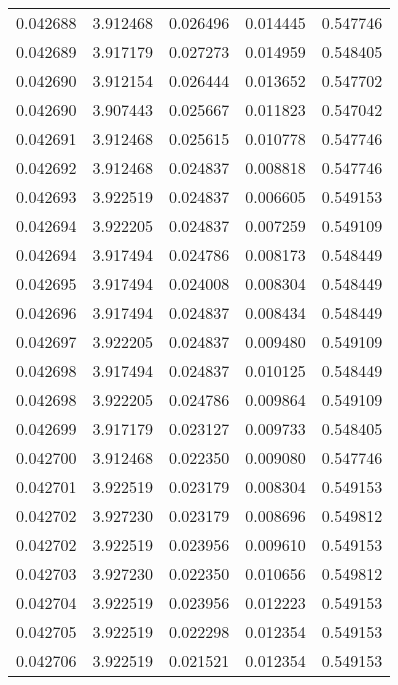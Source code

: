 \begin{tabular}{lrrrr}
0.042688    &  3.912468 &  0.026496 &  0.014445 &             0.547746 \\
0.042689    &  3.917179 &  0.027273 &  0.014959 &             0.548405 \\
0.042690    &  3.912154 &  0.026444 &  0.013652 &             0.547702 \\
0.042690    &  3.907443 &  0.025667 &  0.011823 &             0.547042 \\
0.042691    &  3.912468 &  0.025615 &  0.010778 &             0.547746 \\
0.042692    &  3.912468 &  0.024837 &  0.008818 &             0.547746 \\
0.042693    &  3.922519 &  0.024837 &  0.006605 &             0.549153 \\
0.042694    &  3.922205 &  0.024837 &  0.007259 &             0.549109 \\
0.042694    &  3.917494 &  0.024786 &  0.008173 &             0.548449 \\
0.042695    &  3.917494 &  0.024008 &  0.008304 &             0.548449 \\
0.042696    &  3.917494 &  0.024837 &  0.008434 &             0.548449 \\
0.042697    &  3.922205 &  0.024837 &  0.009480 &             0.549109 \\
0.042698    &  3.917494 &  0.024837 &  0.010125 &             0.548449 \\
0.042698    &  3.922205 &  0.024786 &  0.009864 &             0.549109 \\
0.042699    &  3.917179 &  0.023127 &  0.009733 &             0.548405 \\
0.042700    &  3.912468 &  0.022350 &  0.009080 &             0.547746 \\
0.042701    &  3.922519 &  0.023179 &  0.008304 &             0.549153 \\
0.042702    &  3.927230 &  0.023179 &  0.008696 &             0.549812 \\
0.042702    &  3.922519 &  0.023956 &  0.009610 &             0.549153 \\
0.042703    &  3.927230 &  0.022350 &  0.010656 &             0.549812 \\
0.042704    &  3.922519 &  0.023956 &  0.012223 &             0.549153 \\
0.042705    &  3.922519 &  0.022298 &  0.012354 &             0.549153 \\
0.042706    &  3.922519 &  0.021521 &  0.012354 &             0.549153 \\

\end{tabular}
